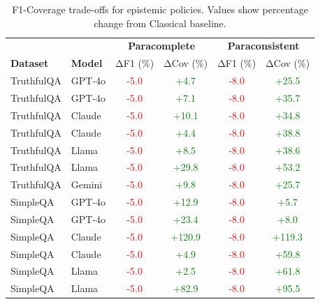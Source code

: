 \begin{table}[htbp]
\centering
\caption{F1-Coverage trade-offs for epistemic policies. Values show percentage change from Classical baseline.}
\begin{tabular}{ll|cc|cc}
\toprule
 & & \multicolumn{2}{c|}{\textbf{Paracomplete}} & \multicolumn{2}{c}{\textbf{Paraconsistent}} \\
\textbf{Dataset} & \textbf{Model} & ΔF1 (\%) & ΔCov (\%) & ΔF1 (\%) & ΔCov (\%) \\
\midrule
TruthfulQA & GPT-4o & \textcolor{red}{-5.0} & \textcolor{green}{+4.7} & \textcolor{red}{-8.0} & \textcolor{green}{+25.5} \\
TruthfulQA & GPT-4o & \textcolor{red}{-5.0} & \textcolor{green}{+7.1} & \textcolor{red}{-8.0} & \textcolor{green}{+35.7} \\
TruthfulQA & Claude & \textcolor{red}{-5.0} & \textcolor{green}{+10.1} & \textcolor{red}{-8.0} & \textcolor{green}{+34.8} \\
TruthfulQA & Claude & \textcolor{red}{-5.0} & \textcolor{green}{+4.4} & \textcolor{red}{-8.0} & \textcolor{green}{+38.8} \\
TruthfulQA & Llama & \textcolor{red}{-5.0} & \textcolor{green}{+8.5} & \textcolor{red}{-8.0} & \textcolor{green}{+38.6} \\
TruthfulQA & Llama & \textcolor{red}{-5.0} & \textcolor{green}{+29.8} & \textcolor{red}{-8.0} & \textcolor{green}{+53.2} \\
TruthfulQA & Gemini & \textcolor{red}{-5.0} & \textcolor{green}{+9.8} & \textcolor{red}{-8.0} & \textcolor{green}{+25.7} \\
SimpleQA & GPT-4o & \textcolor{red}{-5.0} & \textcolor{green}{+12.9} & \textcolor{red}{-8.0} & \textcolor{green}{+5.7} \\
SimpleQA & GPT-4o & \textcolor{red}{-5.0} & \textcolor{green}{+23.4} & \textcolor{red}{-8.0} & \textcolor{green}{+8.0} \\
SimpleQA & Claude & \textcolor{red}{-5.0} & \textcolor{green}{+120.9} & \textcolor{red}{-8.0} & \textcolor{green}{+119.3} \\
SimpleQA & Claude & \textcolor{red}{-5.0} & \textcolor{green}{+4.9} & \textcolor{red}{-8.0} & \textcolor{green}{+59.8} \\
SimpleQA & Llama & \textcolor{red}{-5.0} & \textcolor{green}{+2.5} & \textcolor{red}{-8.0} & \textcolor{green}{+61.8} \\
SimpleQA & Llama & \textcolor{red}{-5.0} & \textcolor{green}{+82.9} & \textcolor{red}{-8.0} & \textcolor{green}{+95.5} \\

\end{tabular}
\end{table}
